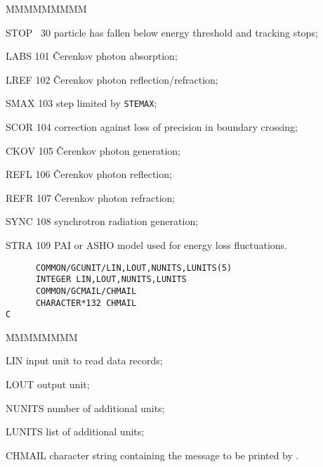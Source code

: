 \begin{DLtt}{MMMMMMMMM}
\item[STOP ~30] particle has fallen below energy threshold and tracking
stops;
\item[LABS 101] \v{C}erenkov photon absorption;
\item[LREF 102] \v{C}erenkov photon reflection/refraction;
\item[SMAX 103] step limited by {\tt STEMAX};
\item[SCOR 104] correction against loss of precision in boundary crossing;
\item[CKOV 105] \v{C}erenkov photon generation;
\item[REFL 106] \v{C}erenkov photon reflection;
\item[REFR 107] \v{C}erenkov photon refraction;
\item[SYNC 108] synchrotron radiation generation;
\item[STRA 109] PAI or ASHO model used for energy loss fluctuations.
\end{DLtt}
\begin{verbatim}
      COMMON/GCUNIT/LIN,LOUT,NUNITS,LUNITS(5)
      INTEGER LIN,LOUT,NUNITS,LUNITS
      COMMON/GCMAIL/CHMAIL
      CHARACTER*132 CHMAIL
C
\end{verbatim}
\begin{DLtt}{MMMMMMMM}
\item[LIN]input unit to read data records;
\item[LOUT]output unit;
\item[NUNITS]number of additional units;
\item[LUNITS]list of additional units;
\item[CHMAIL]character string containing the message to be printed by
             .
\end{DLtt}
 
